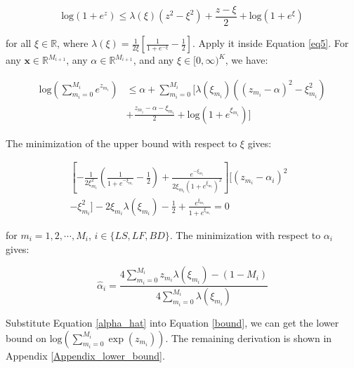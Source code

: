 \documentclass[review]{elsarticle}
\begin{document}
\begin{equation*}
       \text{log}(1 + e^{z})  \leq \lambda(\xi)(z^{2} - \xi^{2}) + \frac{z - \xi}{2} + \text{log}(1 + e^{\xi}) 
\end{equation*}

\noindent for all $\xi \in \mathbb{R}$, where $\lambda(\xi) = \frac{1}{2\xi}[\frac{1}{1+e^{-\xi}} - \frac{1}{2}]$. 
Apply it inside Equation \ref{eq5}. For any $\textbf{x} \in \mathbb{R}^{M_{i + 1}}$, any $\alpha \in \mathbb{R}^{M_{i + 1}}$, and any $\xi \in [0,\infty)^{K}$, we have:

\begin{equation} \label{bound}
\begin{aligned}
    \text{log}(\sum_{m_{i} = 0}^{M_{i}}e^{z_{m_{i}}})
    & \leq \alpha + \sum_{m_{i} = 0}^{M_{i}}[\lambda(\xi_{m_{i}})((z_{m_{i}} - \alpha)^{2} - \xi_{m_{i}}^{2}) \\
    & + \frac{z_{m_{i}} - \alpha - \xi_{m_{i}}}{2} + \text{log}(1 + e^{\xi_{m_{i}}})]
\end{aligned}
\end{equation}

\noindent The minimization of the upper bound with respect to $\xi$ gives:

\begin{equation*}
\begin{aligned}
    [-\frac{1}{2\xi_{m_{i}}^{2}}(\frac{1}{1+e^{-\xi_{m_{i}}}} - \frac{1}{2}) + \frac{e^{-\xi_{m_{i}}}}{2\xi_{m_{i}}(1+e^{\xi_{m_{i}}})^2}][(z_{m_{i}} - \alpha_{i})^{2} & \\ - \xi_{m_{i}}^{2}] 
    - 2\xi_{m_{i}}\lambda(\xi_{m_{i}}) - \frac{1}{2} + \frac{e^{\xi_{m_{i}}}}{1 + e^{\xi_{m_{i}}}} = 0
\end{aligned}
\end{equation*}

\noindent for $m_{i} = 1,2,\cdots,M_{i}$, $i \in \{LS, LF, BD\}$. The minimization with respect to $\alpha_{i}$ gives:

\begin{equation}
    \hat{\alpha}_{i} = \frac{4\sum_{m_{i} = 0}^{M_{i}}z_{m_{i}}\lambda(\xi_{m_{i}}) - (1 - M_{i})}{4\sum_{m_{i} = 0}^{M_{i}}\lambda(\xi_{m_{i}})}
\label{alpha_hat}
\end{equation}

\noindent Substitute Equation \ref{alpha_hat} into Equation \ref{bound}, we can get the lower bound on $\text{log}(\sum_{m_i = 0}^{M_{i}}\exp(z_{m_{i}}))$. The remaining derivation is shown in Appendix \ref{Appendix_lower_bound}.
\end{document}
